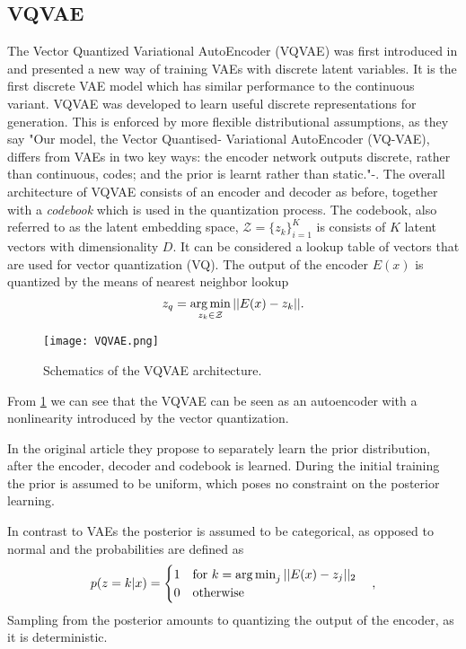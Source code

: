 \documentclass[../../thesis.tex]{subfiles}
\begin{document}
\subsection{VQVAE}
The Vector Quantized Variational AutoEncoder (VQVAE) was first introduced in \cite{VQVAE} and presented a new way of training VAEs with discrete latent variables. It is the first discrete VAE model which has similar performance to the continuous variant. VQVAE was developed to learn useful discrete representations for generation. This is enforced by more flexible distributional assumptions, as they say "Our model, the Vector Quantised-
Variational AutoEncoder (VQ-VAE), differs from VAEs in two key ways: the
encoder network outputs discrete, rather than continuous, codes; and the prior
is learnt rather than static."-\cite{VQVAE}. 
\newline
The overall architecture of VQVAE consists of an encoder and decoder as before, together with a \textit{codebook} which is used in the quantization process. The codebook, also referred to as the latent embedding space, $\mathcal{Z} = \{z_k\}_{i=1}^K$ is consists of $K$ latent vectors with dimensionality $D$. It can be considered a lookup table of vectors that are used for vector quantization (VQ). The output of the encoder $E(x)$ is quantized by the means of nearest neighbor lookup
\begin{equation}
    z_q = \operatorname*{arg\,min}_{z_k\in\mathcal{Z}} ||E(x)-z_k||.
\end{equation}

\begin{figure}[h]
    \texttt{[image: VQVAE.png]}
    \centering
    \caption{Schematics of the VQVAE architecture.}
    \label{fig:VQVAE}
\end{figure}
From \ref{fig:VQVAE} we can see that the VQVAE can be seen as an autoencoder with a nonlinearity introduced by the vector quantization. \newline

In the original article \cite{VQVAE} they propose to separately learn the prior distribution, after the encoder, decoder and codebook is learned. During the initial training the prior is assumed to be uniform, which poses no constraint on the posterior learning. \newline

In contrast to VAEs the posterior is assumed to be categorical, as opposed to normal and the probabilities are defined as
\begin{equation}
    p(z=k | x) = 
    \begin{cases} 
        1 \quad \text{for }k = \operatorname*{arg\,min}_j||E(x) - z_j||_2 \\
        0 \quad \text{otherwise}
    \end{cases},
\end{equation}
Sampling from the posterior amounts to quantizing the output of the encoder, as it is deterministic. \newline
\end{document}
